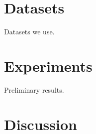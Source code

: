 \documentclass{article}
\newcommand{\bb}[1]{\boldsymbol{#1}}
\begin{document}

\section{Datasets}

	Datasets we use.




\section{Experiments}

	Preliminary results.





\section{Discussion}













\end{document}
